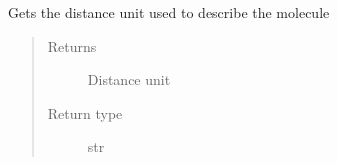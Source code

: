 \documentclass[letterpaper,10pt,english]{sphinxmanual}
\begin{document}
\begin{fulllineitems}
\begin{fulllineitems}
\begin{quote}
\begin{description}
\end{description}\end{quote}

\end{fulllineitems}


\begin{fulllineitems}
\label{\detokenize{molecular:molecular.Molecule.dist_unit}}
\sphinxAtStartPar
Gets the distance unit used to describe the molecule
\begin{quote}\begin{description}
\item[{Returns}] \leavevmode
\sphinxAtStartPar
Distance unit

\item[{Return type}] \leavevmode
\sphinxAtStartPar
str

\end{description}\end{quote}

\end{fulllineitems}



\end{fulllineitems}
\end{document}
